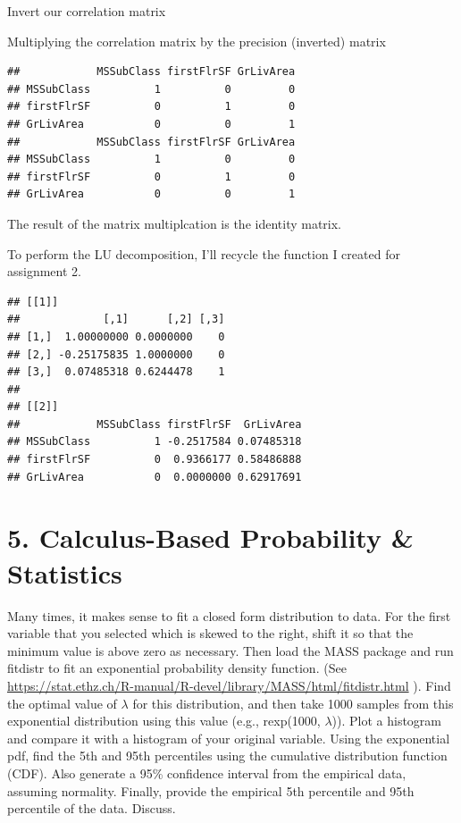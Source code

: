 \documentclass[]{article}
\begin{document}
Invert our correlation matrix

Multiplying the correlation matrix by the precision (inverted) matrix

\begin{verbatim}
##            MSSubClass firstFlrSF GrLivArea
## MSSubClass          1          0         0
## firstFlrSF          0          1         0
## GrLivArea           0          0         1
##            MSSubClass firstFlrSF GrLivArea
## MSSubClass          1          0         0
## firstFlrSF          0          1         0
## GrLivArea           0          0         1
\end{verbatim}

The result of the matrix multiplcation is the identity matrix.

To perform the LU decomposition, I'll recycle the function I created for
assignment 2.

\begin{verbatim}
## [[1]]
##             [,1]      [,2] [,3]
## [1,]  1.00000000 0.0000000    0
## [2,] -0.25175835 1.0000000    0
## [3,]  0.07485318 0.6244478    1
## 
## [[2]]
##            MSSubClass firstFlrSF  GrLivArea
## MSSubClass          1 -0.2517584 0.07485318
## firstFlrSF          0  0.9366177 0.58486888
## GrLivArea           0  0.0000000 0.62917691
\end{verbatim}

\hypertarget{calculus-based-probability-statistics}{%
\section{5. Calculus-Based Probability \&
Statistics}\label{calculus-based-probability-statistics}}

Many times, it makes sense to fit a closed form distribution to data.
For the first variable that you selected which is skewed to the right,
shift it so that the minimum value is above zero as necessary. Then load
the MASS package and run fitdistr to fit an exponential probability
density function. (See
\url{https://stat.ethz.ch/R-manual/R-devel/library/MASS/html/fitdistr.html}
). Find the optimal value of \(\lambda\) for this distribution, and then
take 1000 samples from this exponential distribution using this value
(e.g., rexp(1000, \(\lambda\))). Plot a histogram and compare it with a
histogram of your original variable. Using the exponential pdf, find the
5th and 95th percentiles using the cumulative distribution function
(CDF). Also generate a 95\% confidence interval from the empirical data,
assuming normality. Finally, provide the empirical 5th percentile and
95th percentile of the data. Discuss.
\end{document}
